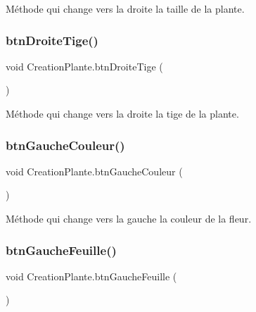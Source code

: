 Méthode qui change vers la droite la taille de la plante. \mbox{\label{class_creation_plante_a395f2d532ddef2f3ce4615793931376d}} 
\subsubsection{\texorpdfstring{btn\+Droite\+Tige()}{btnDroiteTige()}}
{\footnotesize\ttfamily void Creation\+Plante.\+btn\+Droite\+Tige (\begin{DoxyParamCaption}{ }\end{DoxyParamCaption})\hspace{0.3cm}{\ttfamily [inline]}}

Méthode qui change vers la droite la tige de la plante. \mbox{\label{class_creation_plante_a94fa1743f06bd1d7476fe65f3132874d}} 
\subsubsection{\texorpdfstring{btn\+Gauche\+Couleur()}{btnGaucheCouleur()}}
{\footnotesize\ttfamily void Creation\+Plante.\+btn\+Gauche\+Couleur (\begin{DoxyParamCaption}{ }\end{DoxyParamCaption})\hspace{0.3cm}{\ttfamily [inline]}}

Méthode qui change vers la gauche la couleur de la fleur. \mbox{\label{class_creation_plante_a9d3916ef1e86a0bd00649f10e1f9ccaa}} 
\subsubsection{\texorpdfstring{btn\+Gauche\+Feuille()}{btnGaucheFeuille()}}
{\footnotesize\ttfamily void Creation\+Plante.\+btn\+Gauche\+Feuille (\begin{DoxyParamCaption}{ }\end{DoxyParamCaption})\hspace{0.3cm}{\ttfamily [inline]}}

